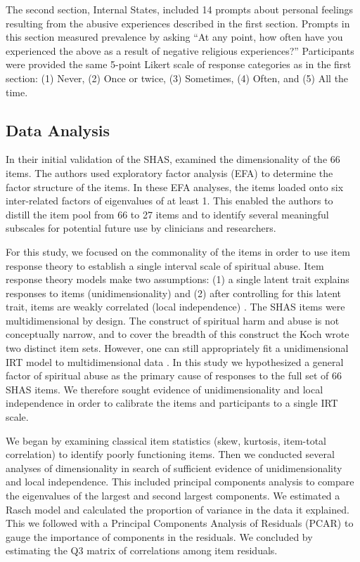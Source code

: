 \documentclass[
]{article}
\begin{document}
The second section, Internal States, included 14 prompts about personal feelings resulting from the abusive experiences described in the first section. Prompts in this section measured prevalence by asking ``At any point, how often have you experienced the above as a result of negative religious experiences?'' Participants were provided the same 5-point Likert scale of response categories as in the first section: (1) Never, (2) Once or twice, (3) Sometimes, (4) Often, and (5) All the time.

\hypertarget{data-analysis}{%
\subsection{Data Analysis}\label{data-analysis}}

In their initial validation of the SHAS, \citet{KochEdstrom2022} examined the dimensionality of the 66 items. The authors used exploratory factor analysis (EFA) to determine the factor structure of the items. In these EFA analyses, the items loaded onto six inter-related factors of eigenvalues of at least 1. This enabled the authors to distill the item pool from 66 to 27 items and to identify several meaningful subscales for potential future use by clinicians and researchers.

For this study, we focused on the commonality of the items in order to use item response theory to establish a single interval scale of spiritual abuse. Item response theory models make two assumptions: (1) a single latent trait explains responses to items (unidimensionality) and (2) after controlling for this latent trait, items are weakly correlated (local independence) \citep{EmbretsonReise2000, ReiseWaller2009, ReiseBonifayHaviland2013}. The SHAS items were multidimensional by design. The construct of spiritual harm and abuse is not conceptually narrow, and to cover the breadth of this construct the Koch wrote two distinct item sets. However, one can still appropriately fit a unidimensional IRT model to multidimensional data \citep{ReiseMooreHaviland2013}. In this study we hypothesized a general factor of spiritual abuse as the primary cause of responses to the full set of 66 SHAS items. We therefore sought evidence of unidimensionality and local independence in order to calibrate the items and participants to a single IRT scale.

We began by examining classical item statistics (skew, kurtosis, item-total correlation) to identify poorly functioning items. Then we conducted several analyses of dimensionality in search of sufficient evidence of unidimensionality and local independence. This included principal components analysis to compare the eigenvalues of the largest and second largest components. We estimated a Rasch model and calculated the proportion of variance in the data it explained. This we followed with a Principal Components Analysis of Residuals (PCAR) to gauge the importance of components in the residuals. We concluded by estimating the Q3 matrix of correlations among item residuals.
\end{document}
